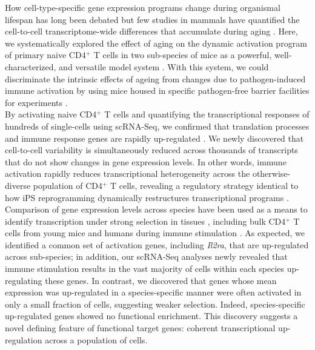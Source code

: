 How cell-type-specific gene expression programs change during organismal lifespan has long been debated \citep{Bahar2006, Warren2007} but few studies in mammals have quantified the cell-to-cell transcriptome-wide differences that accumulate during aging \citep{Kowalczyk2015}. Here, we systematically explored the effect of aging on the dynamic activation program of primary naive CD4$^+$ T cells in two sub-species of mice as a powerful, well-characterized, and versatile model system \citep{Shay2013}. With this system, we could discriminate the intrinsic effects of ageing from changes due to pathogen-induced immune activation by using mice housed in specific pathogen-free barrier facilities for experiments \citep{Beura2016}.\\

By activating naive CD4$^+$ T cells and quantifying the transcriptional responses of hundreds of single-cells using scRNA-Seq, we confirmed that translation processes and immune response genes are rapidly up-regulated \citep{Neme2016, Asmal2003}. We newly discovered that cell-to-cell variability is simultaneously reduced across thousands of transcripts that do not show changes in gene expression levels. In other words, immune activation rapidly reduces transcriptional heterogeneity across the otherwise-diverse population of CD4$^+$ T cells, revealing a regulatory strategy identical to how iPS reprogramming dynamically restructures transcriptional programs \citep{Buganim2012}. \\

Comparison of gene expression levels across species have been used as a means to identify transcription under strong selection in tissues \citep{Brawand2011, Sudmant2015, Romero2012, Barbosa-Morais2012, Perry2012}, including bulk CD4$^+$ T cells from young mice and humans during immune stimulation \citep{Shay2013}. As expected, we identified a common set of activation genes, including \textit{Il2ra}, that are up-regulated across sub-species; in addition, our scRNA-Seq analyses newly revealed that immune stimulation results in the vast majority of cells within each species up-regulating these genes. In contrast, we discovered that genes whose mean expression was up-regulated in a species-specific manner were often activated in only a small fraction of cells, suggesting weaker selection. Indeed, species-specific up-regulated genes showed no functional enrichment. This discovery suggests a novel defining feature of functional target genes: coherent transcriptional up-regulation across a population of cells. \\

